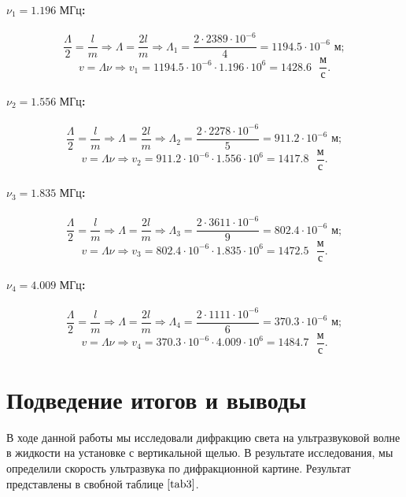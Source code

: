 \documentclass[a4paper,12pt]{article} %
\begin{document}
\paragraph{$\nu_1=1.196\text{ МГц}$:}

\[ \frac{\Lambda}{2} = \frac{l}{m} \Rightarrow \Lambda=\frac{2l}{m} \Rightarrow \Lambda_1=\frac{2\cdot2389\cdot10^{-6}}{4} = 1194.5\cdot10^{-6}\text{ м}; \]
\[ v=\Lambda\nu \Rightarrow v_1= 1194.5\cdot10^{-6}\cdot1.196\cdot10^{6}=1428.6\text{ }\frac{\text{м}}{\text{с}}. \]

\paragraph{$\nu_2=1.556\text{ МГц}$:}

\[ \frac{\Lambda}{2} = \frac{l}{m} \Rightarrow \Lambda=\frac{2l}{m} \Rightarrow \Lambda_2=\frac{2\cdot2278\cdot10^{-6}}{5} = 911.2\cdot10^{-6}\text{ м}; \]
\[ v=\Lambda\nu \Rightarrow v_2= 911.2\cdot10^{-6}\cdot1.556\cdot10^{6}=1417.8\text{ }\frac{\text{м}}{\text{с}}. \]

\paragraph{$\nu_3=1.835\text{ МГц}$:}

\[ \frac{\Lambda}{2} = \frac{l}{m} \Rightarrow \Lambda=\frac{2l}{m} \Rightarrow \Lambda_3=\frac{2\cdot3611\cdot10^{-6}}{9} = 802.4\cdot10^{-6}\text{ м}; \]
\[ v=\Lambda\nu \Rightarrow v_3= 802.4\cdot10^{-6}\cdot1.835\cdot10^{6}=1472.5\text{ }\frac{\text{м}}{\text{с}}. \]

\paragraph{$\nu_4=4.009\text{ МГц}$:}

\[ \frac{\Lambda}{2} = \frac{l}{m} \Rightarrow \Lambda=\frac{2l}{m} \Rightarrow \Lambda_4=\frac{2\cdot1111\cdot10^{-6}}{6} = 370.3\cdot10^{-6}\text{ м}; \]
\[ v=\Lambda\nu \Rightarrow v_4= 370.3\cdot10^{-6}\cdot4.009\cdot10^{6}=1484.7\text{ }\frac{\text{м}}{\text{с}}. \]

\section{Подведение итогов и выводы}

В ходе данной работы мы исследовали дифракцию света на ультразвуковой волне в жидкости на установке с вертикальной щелью.
В результате исследования, мы определили скорость ультразвука по дифракционной картине. Результат представлены в свобной таблице $\ref{tab3}$.
\end{document}
